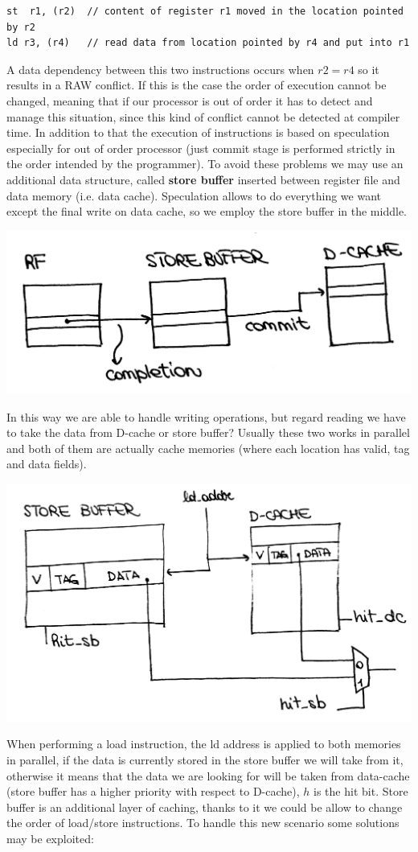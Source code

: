 \begin{verbatim}
st  r1, (r2)  // content of register r1 moved in the location pointed by r2
ld r3, (r4)   // read data from location pointed by r4 and put into r1
\end{verbatim}

A data dependency between this two instructions occurs when $r2 = r4$ so it results in a RAW conflict. If this is the case the order of execution cannot be changed, meaning that if our processor is out of order it has to detect and manage this situation, since this kind of conflict cannot be detected at compiler time.
In addition to that the execution of instructions is based on speculation especially for out of order processor (just commit stage is performed strictly in the order intended by the programmer). To avoid these problems we may use an additional data structure, called \textbf{store buffer} inserted between register file and data memory (i.e. data cache). Speculation allows to do everything we want except the final write on data cache, so we employ the store buffer in the middle.
\begin{center}
  \includegraphics[width=0.7\linewidth]{img/img3/30}
\end{center}

In this way we are able to handle writing operations, but regard reading we have to take the data from D-cache or store buffer? Usually these two works in parallel and both of them are actually cache memories (where each location has valid, tag and data fields).
\begin{center}
  \includegraphics[width=0.7\linewidth]{img/img3/31}
\end{center}
When performing a load instruction, the ld address is applied to both memories in parallel, if the data is currently stored in the store buffer we will take from it, otherwise it means that the data we are looking for will be taken from data-cache (store buffer has a higher priority with respect to D-cache), $h$ is the hit bit. Store buffer is an additional layer of caching, thanks to it we could be allow to change the order of load/store instructions. To handle this new scenario some solutions may be exploited:

